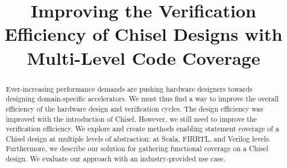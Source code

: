 \documentclass[runningheads]{llncs}
\begin{document}
%
\title{Improving the Verification Efficiency of Chisel Designs with Multi-Level Code Coverage}
%
%
%

%
%
\maketitle              %
%
\begin{abstract}
Ever-increasing performance demands are pushing hardware designers towards designing domain-specific accelerators. We must thus find a way to improve the overall efficiency of the hardware design and verification cycles. The design efficiency was improved with the introduction of Chisel. However, we still need to improve the verification efficiency.
We explore and create methods enabling statement coverage of a Chisel design at multiple levels of abstraction: at Scala, FIRRTL, and Verilog levels. Furthermore, we describe our solution for gathering functional coverage on a Chisel design.
We evaluate our approach with an industry-provided use case.



\end{abstract}
%
%
%
\end{document}

